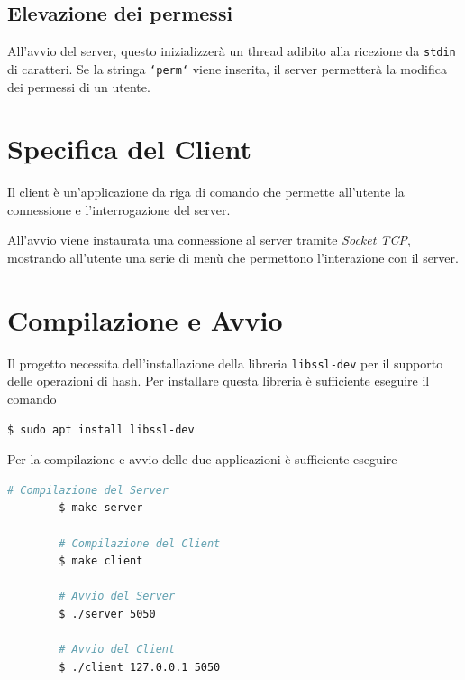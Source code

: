 \documentclass[11pt, a4paper]{article}
\begin{document}
	\subsection{Elevazione dei permessi}
	
	All'avvio del server, questo inizializzerà un thread adibito alla ricezione da \texttt{stdin} di caratteri. Se la stringa \texttt{`perm`} viene inserita, il server permetterà la modifica dei permessi di un utente.
	
	\section{Specifica del Client}
	
	Il client è un'applicazione da riga di comando che permette all'utente la connessione e l'interrogazione del server.
	
	All'avvio viene instaurata una connessione al server tramite \textit{Socket TCP}, mostrando all'utente una serie di menù che permettono l'interazione con il server.
	
	\section{Compilazione e Avvio}
	
	Il progetto necessita dell'installazione della libreria \texttt{libssl-dev} per il supporto delle operazioni di hash.
	Per installare questa libreria è sufficiente eseguire il comando 
	
	\begin{lstlisting}[language=bash]
		$ sudo apt install libssl-dev
	\end{lstlisting}
	
	Per la compilazione e avvio delle due applicazioni è sufficiente eseguire
	
	\begin{lstlisting}[language=bash]
		# Compilazione del Server
		$ make server
		
		# Compilazione del Client
		$ make client
		
		# Avvio del Server
		$ ./server 5050
		
		# Avvio del Client
		$ ./client 127.0.0.1 5050
	\end{lstlisting}
	
\end{document}
